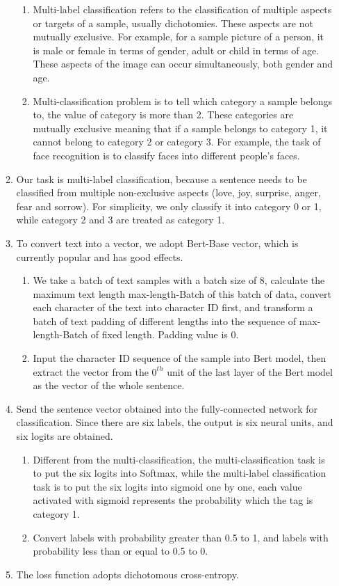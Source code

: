 \documentclass[12pt,twocolumn,letterpaper]{article}
\begin{document}
\begin{enumerate}
\begin{enumerate}
\begin{enumerate}
\item Multi-label classification refers to the classification of multiple aspects or targets of a sample, usually dichotomies. These aspects are not mutually exclusive. For example, for a sample picture of a person, it is male or female in terms of gender, adult or child in terms of age. These aspects of the image can occur simultaneously, both gender and age.  
\item Multi-classification problem is to tell which category a sample belongs to, the value of category is more than 2. These categories are mutually exclusive meaning that if a sample belongs to category 1, it cannot belong to category 2 or category 3. For example, the task of face recognition is to classify faces into different people's faces.  
\end{enumerate}

\item Our task is multi-label classification, because a sentence needs to be classified from multiple non-exclusive aspects (love, joy, surprise, anger, fear and sorrow). For simplicity, we only classify it into category 0 or 1, while category 2 and 3 are treated as category 1.  
\item To convert text into a vector, we adopt Bert-Base vector, which is currently popular and has good effects.  
\begin{enumerate}
\item We take a batch of text samples with a batch size of 8, calculate the maximum text length max-length-Batch of this batch of data, convert each character of the text into character ID first, and transform a batch of text padding of different lengths into the sequence of max-length-Batch of fixed length. Padding value is 0.  
\item Input the character ID sequence of the sample into Bert model, then extract the vector from the $0^{th}$ unit of the last layer of the Bert model as the vector of the whole sentence.  
\end{enumerate}
\item Send the sentence vector obtained into the fully-connected network for classification. Since there are six labels, the output is six neural units, and six logits are obtained.  
\begin{enumerate}
\item Different from the multi-classification, the multi-classification task is to put the six logits into Softmax, while the multi-label classification task is to put the six logits into sigmoid one by one, each value activated with sigmoid represents the probability which the tag is category 1.  
\item Convert labels with probability greater than 0.5 to 1, and labels with probability less than or equal to 0.5 to 0. 
\end{enumerate}
\item The loss function adopts dichotomous cross-entropy.  


\end{enumerate}
\end{enumerate}
\end{document}
